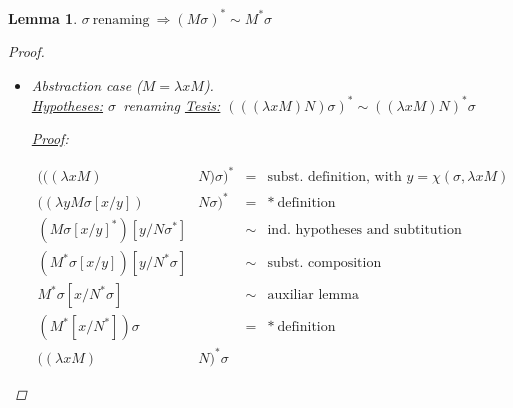 \documentclass{article}
\newcommand{\lam}{\ensuremath{\lambda}}
\newcommand{\alpsy}{\ensuremath{\sim}}
\newcommand{\choice}[2]{\ensuremath{\chi(#1,#2)}}
\newcommand{\then}{\ensuremath{\Rightarrow}}
\newtheorem{lem}{Lemma}
\begin{document}
\begin{lem}{$\sigma\ \text{renaming}\ \then  (M\sigma)^* \alpsy M^*\sigma$}
\begin{proof}
\begin{itemize}
      \underline{Proof}: 
      \[ ((M N)\sigma)^* = (M\sigma  N \sigma )^* = M\sigma^*  N \sigma^* \stackrel{\mbox{ind. hyp.}}{=} M^*\sigma N^*\sigma = (M ^* N ^*) \sigma = (M N)^* \sigma \]

    \item[application case:] Abstraction case ($M = \lam x M$). \\
      \underline{Hypotheses:} $\sigma$\ renaming
      \underline{Tesis:} $(((\lam x M) N)\sigma)^* \alpsy ((\lam x M) N) ^* \sigma$

      \underline{Proof}: 

      \[
      \begin{array}{llcl}
              (((\lam x M)& N)\sigma)^* &=&  \text{subst. definition, with } y=\choice{\sigma}{\lam x M}\\  
              ((\lam y M\sigma[x/y])& N\sigma)^* &=&  *\ \text{definition} \\
              (M\sigma[x/y]^*)[y/N\sigma^*] & &\alpsy&  \text{ind. hypotheses and subtitution lemma} \\
              (M^*\sigma[x/y])[y/N^*\sigma] & &\alpsy&  \text{subst. composition} \\
              M^*\sigma[x/N^*\sigma] & &\alpsy&  \text{auxiliar lemma} \\
              (M^*[x/N^*])\sigma & &=&  *\ \text{definition} \\
              ((\lam x M) & N) ^* \sigma
      \end{array}
      \]

\end{itemize}
\end{proof}
\end{lem}


\end{document}

